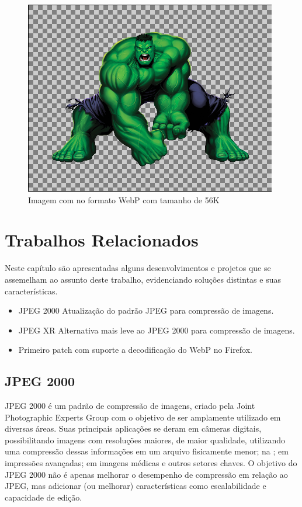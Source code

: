 \documentclass[espaco=simples,appendix=Name]{abnt}
\begin{document}
\begin{figure}[h]
  \centering
    \includegraphics[scale=0.5]{Imagem3AlphaWEBP.png}
  \caption{Imagem com  no formato WebP com tamanho de 56K}
\end{figure}


\chapter{Trabalhos Relacionados}

Neste capítulo são apresentadas alguns desenvolvimentos e projetos que se assemelham ao assunto deste trabalho, evidenciando soluções distintas e suas características.

\begin{itemize}
	\item JPEG 2000 Atualização do padrão JPEG para compressão de imagens.
	\item JPEG XR Alternativa mais leve ao JPEG 2000 para compressão de imagens.
	\item Primeiro patch com suporte a decodificação do WebP no Firefox.
\end{itemize}


\section{JPEG 2000}

JPEG 2000 é um padrão de compressão de imagens, criado pela Joint Photographic Experts Group com o objetivo de ser amplamente utilizado em diversas áreas. Suas principais aplicações se deram em câmeras digitais, possibilitando imagens com resoluções maiores, de maior qualidade, utilizando uma compressão dessas informações em um arquivo fisicamente menor; na ; em impressões avançadas; em imagens médicas e outros setores chaves. O objetivo do JPEG 2000 não é apenas melhorar o desempenho de compressão em relação ao JPEG, mas adicionar (ou melhorar) características como escalabilidade e capacidade de edição.
\end{document}
